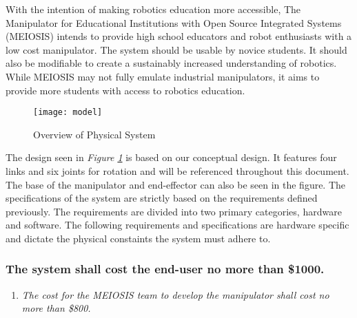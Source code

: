 \label{sec:intro}
With the intention of making robotics education more accessible, The Manipulator for Educational Institutions with Open Source Integrated Systems (MEIOSIS) intends to provide high school educators and robot enthusiasts with a low cost manipulator. The system should be usable by novice students. It should also be modifiable to create a sustainably increased understanding of robotics. While MEIOSIS may not fully emulate industrial manipulators, it aims to provide more students with access to robotics education. \\
\begin{figure}[htp]
  \centering
  \texttt{[image: model]}
  \caption{Overview of Physical System}
  \label{fig:model}
\end{figure}
\newline
The design seen in \emph{Figure \ref{fig:model}} is based on our conceptual design. It features four links and six joints for rotation and will be referenced throughout this document. The base of the manipulator and end-effector can also be seen in the figure.
The specifications of the system are strictly based on the requirements defined previously. The requirements are divided into two primary categories, hardware and software.
\vspace{-\baselineskip}
The following requirements and specifications are hardware specific and dictate the physical constaints the system must adhere to.
\vspace{-\baselineskip}
\subsubsection{The system shall cost the end-user no more than \$1000.}
\begin{enumerate}
  \item \textit{The cost for the MEIOSIS team to develop the manipulator shall cost no more than \$800.}
\end{enumerate}

